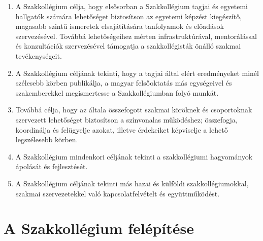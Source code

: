 \documentclass[12pt]{report}
\begin{document}
\begin{enumerate}
  \item A Szakkollégium célja, hogy elsősorban a Szakkollégium tagjai és egyetemi hallgatók számára lehetőséget biztosítson az egyetemi képzést 
    kiegészítő, magasabb szintű ismeretek elsajátítására tanfolyamok és előadások szervezésével. Továbbá lehetőségeihez mérten infrastruktúrával, 
    mentorálással és konzultációk szervezésével támogatja a szakkollégisták önálló szakmai tevékenységeit.
  \item A Szakkollégium céljának tekinti, hogy a tagjai által elért eredményeket minél szélesebb körben publikálja, a magyar felsőoktatás más 
    egységeivel és szakemberekkel megismertesse a Szakkollégiumban folyó munkát.
  \item Továbbá célja, hogy az általa összefogott szakmai köröknek és csoportoknak szervezett lehetőséget biztosítson a színvonalas működéshez; 
    összefogja, koordinálja és felügyelje azokat, illetve érdekeiket képviselje a lehető legszélesebb körben.
  \item A Szakkollégium mindenkori céljának tekinti a szakkollégiumi hagyományok ápolását és fejlesztését.
  \item A Szakkollégium céljának tekinti más hazai és külföldi szakkollégiumokkal, szakmai szervezetekkel való kapcsolatfelvételt és együttműködést.
\end{enumerate}


\section{A Szakkollégium felépítése}
\end{document}
